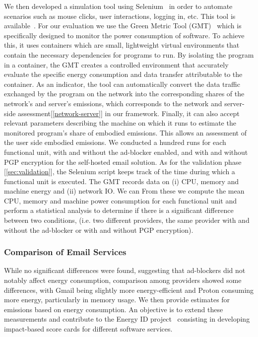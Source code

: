 \documentclass[sigconf,9pt,usenames,dvipsnames,table]{acmart}
\begin{document}
We then developed a simulation tool using Selenium~\cite{selenium} in order to automate scenarios such as mouse clicks, user interactions, logging in, etc. This tool is available~\cite{artifact-jason}.
For our evaluation we use the Green Metric Tool (GMT)~\cite{greencoding} which is specifically designed to monitor the power consumption of software. To achieve this, it uses containers which are small, lightweight virtual environments that contain the necessary dependencies for programs to run. By isolating the program in a container, the GMT creates a controlled environment that accurately evaluate the specific energy consumption and data transfer attributable to the container. As an indicator, the tool can automatically convert the data traffic exchanged by the program on the network into the corresponding shares of the network's and server's emissions, which corresponds to the network and server-side assessment[\ref{network-server}] in our framework.
Finally, it can also accept relevant parameters describing the machine on which it runs to estimate the monitored program’s share of embodied emissions. This allows an assessment of the user side embodied emissions.
We conducted a hundred runs for each functional unit, with and without the ad-blocker enabled, and with and without PGP encryption for the self-hosted email solution. As for the validation phase [\ref{sec:validation}], the Selenium script keeps track of the time during which a functional unit is executed. The GMT records data on (i) CPU, memory and machine energy and (ii) network IO. We can From these we compute the mean CPU, memory and machine power consumption for each functional unit and perform a statistical analysis to determine if there is a significant difference between two conditions, (i.e. two different providers, the same provider with and without the ad-blocker or with and without PGP encryption).

\subsubsection{Comparison of Email Services}



While no
significant differences were found, suggesting that ad-blockers did not
notably affect energy consumption, comparison among providers showed some
differences, with Gmail being slightly more energy-efficient and Proton
consuming more energy, particularly in memory usage. We then provide
estimates for emissions based on energy consumption. An objective is to extend these measurements and contribute to the Energy ID project~\cite{greencoding:energyid} consisting in developing impact-based score cards for different software services.
%
\end{document}
